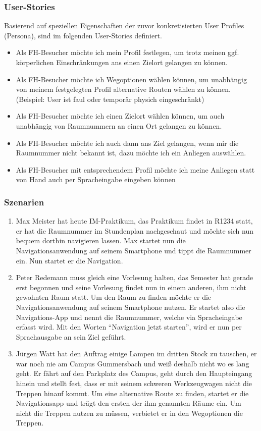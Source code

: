 \subsubsection*{User-Stories}
Basierend auf speziellen Eigenschaften der zuvor konkretisierten User Profiles (Persona), sind im folgenden User-Stories definiert.
\begin{itemize}
\item Als FH-Besucher möchte ich mein Profil festlegen, um trotz meinen ggf. körperlichen Einschränkungen ans einen Zielort gelangen zu können.
\item Als FH-Besucher möchte ich Wegoptionen wählen können, um unabhängig von meinem festgelegten Profil alternative Routen wählen zu können. (Beispiel: User ist faul oder temporär physich eingeschränkt)
\item Als FH-Besucher möchte ich einen Zielort wählen können, um auch unabhängig von Raumnummern an einen Ort gelangen zu können.
\item Als FH-Besucher möchte ich auch dann ans Ziel gelangen, wenn mir die Raumnummer nicht bekannt ist, dazu möchte ich ein Anliegen auswählen.
\item Als FH-Besucher mit entsprechendem Profil möchte ich meine Anliegen statt von Hand auch per Spracheingabe eingeben können
\end{itemize}

\subsubsection*{Szenarien}
\begin{enumerate}
  \item Max Meister hat heute IM-Praktikum, das Praktikum findet in R1234 statt, er hat die Raumnummer im Stundenplan nachgeschaut und möchte sich nun bequem dorthin navigieren lassen. Max startet nun die Navigationsanwendung auf seinem Smartphone und tippt die Raumnummer ein. Nun startet er die Navigation.
  \item Peter Redemann muss gleich eine Vorlesung halten, das Semester hat gerade erst begonnen und seine Vorlesung findet nun in einem anderen, ihm nicht gewohnten Raum statt. Um den Raum zu finden möchte er die Navigationsanwendung auf seinem Smartphone nutzen. Er startet also die Navigations-App und nennt die Raumnummer, welche via Spracheingabe erfasst wird. Mit den Worten “Navigation jetzt starten”, wird er nun per Sprachausgabe an sein Ziel geführt.
  \item Jürgen Watt hat den Auftrag einige Lampen im dritten Stock zu tauschen, er war noch nie am Campus Gummersbach und weiß deshalb nicht wo es lang geht. Er fährt auf den Parkplatz des Campus, geht durch den Haupteingang hinein und stellt fest, dass er mit seinem schweren Werkzeugwagen nicht die Treppen hinauf kommt. Um eine alternative Route zu finden, startet er die Navigationsapp und trägt den ersten der ihm genannten Räume ein. Um nicht die Treppen nutzen zu müssen, verbietet er in den Wegoptionen die Treppen.
\end{enumerate}

